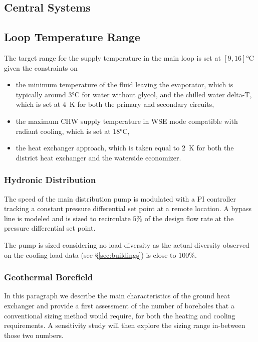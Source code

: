 \subsection{Central Systems}

\subsection{Loop Temperature Range} \label{sec:loop_range}

The target range for the supply temperature in the main loop is set at $[9, 16]$°C given the constraints on

\begin{itemize}
    \item the minimum temperature of the fluid leaving the evaporator, which is typically around $3$°C for water without glycol, and the chilled water delta-T, which is set at $4$~K for both the primary and secondary circuits,
    \item the maximum CHW supply temperature in WSE mode compatible with radiant cooling, which is set at $18$°C,
    \item the heat exchanger approach, which is taken equal to $2$~K for both the district heat exchanger and the waterside economizer.
\end{itemize}


\subsubsection{Hydronic Distribution} \label{sec:distrib}

The speed of the main distribution pump is modulated with a PI controller tracking a constant pressure differential set point at a remote location. A bypass line is modeled and is sized to recirculate $5\%$ of the design flow rate at the pressure differential set point.

The pump is sized considering no load diversity as the actual diversity observed on the cooling load data (see §\ref{sec:buildings}) is close to $100\%$.

\subsubsection{Geothermal Borefield} \label{sec:geo}

In this paragraph we describe the main characteristics of the ground heat exchanger and provide a first assessment of the number of boreholes that a conventional sizing method would require, for both the heating and cooling requirements.
A sensitivity study will then explore the sizing range in-between those two numbers.

